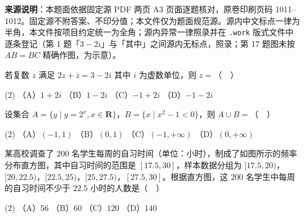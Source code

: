 


\begin{gktip}
\textbf{来源说明}：本题面依据固定源 PDF 两页 A3 页面逐题核对，原卷印刷页码 1011–1012。固定源不附答案、不印分值；本文件仅为题面规范源。源内中文标点一律为半角，本文件按项目约定统一为全角；源内异常一律照录并在 \texttt{.work} 版式文件中逐条登记（第 1 题「\(3-2i\)」与「其中」之间源内无标点，照录；第 17 题图未按 \(AB=BC\) 精确作图，为示意）。
\end{gktip}


\begin{question}
若复数 \(z\) 满足 \(2z+\overline{z}=3-2i\) 其中 \(i\) 为虚数单位，则 \(z=\)（　）

\begin{gkopts}(2)
\task （A）\(1+2i\)
\task （B）\(1-2i\)
\task （C）\(-1+2i\)
\task （D）\(-1-2i\)
\end{gkopts}

\end{question}
\begin{question}
设集合 \(A=\{y\mid y=2^{x},x\in\mathbf{R}\}\)，\(B=\{x\mid x^{2}-1<0\}\)，则 \(A\cup B=\)（　）

\begin{gkopts}(2)
\task （A）\((-1,1)\)
\task （B）\((0,1)\)
\task （C）\((-1,+\infty)\)
\task （D）\((0,+\infty)\)
\end{gkopts}

\Needspace{0.4\textheight}
\end{question}
\begin{question}
某高校调查了 \(200\) 名学生每周的自习时间（单位：小时），制成了如图所示的频率分布直方图，其中自习时间的范围是 \([17.5,30]\)，样本数据分组为 \([17.5,20)\)，\([20,22.5)\)，\([22.5,25)\)，\([25,27.5)\)，\([27.5,30]\)。根据直方图，这 \(200\) 名学生中每周的自习时间不少于 \(22.5\) 小时的人数是（　）
\nopagebreak[4]
\begin{center}\end{center}
\nopagebreak[4]
\begin{gkopts}(2)
\task （A）\(56\)
\task （B）\(60\)
\task （C）\(120\)
\task （D）\(140\)
\end{gkopts}

\end{question}
